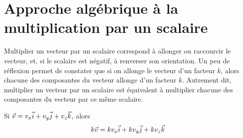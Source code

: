 

\section{Approche algébrique à la multiplication par un scalaire}

Multiplier un vecteur par un scalaire correspond à allonger ou raccourcir le
vecteur, et, si le scalaire est négatif, à renverser son orientation.  Un peu
de réflexion permet de constater que si on allonge le vecteur d'un facteur $k$,
alors chacune des composantes du vecteur allonge d'un facteur $k$.  Autrement
dit, multiplier un vecteur par un scalaire est équivalent à multiplier chacune
des composantes du vecteur par ce même scalaire.

Si $\vec{v} = v_x \vec{i} + v_y \vec{j} + v_z \vec{k}$, alors
\[
  k\vec{v} = kv_x \vec{i} + kv_y \vec{j} + kv_z \vec{k}
\]

